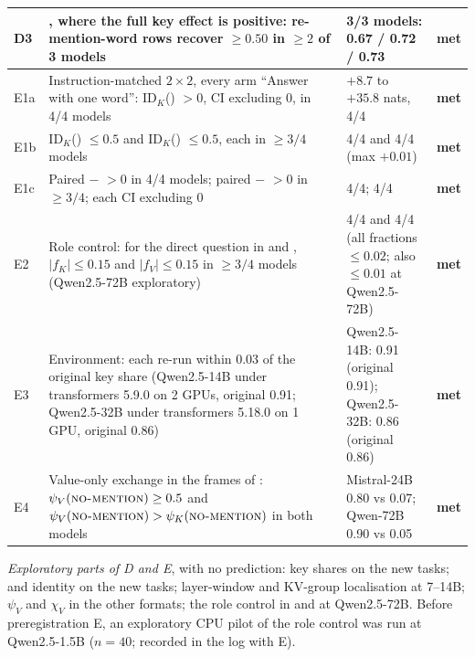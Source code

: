\begin{table}[!ht]
\begin{tabular}{p{}p{}p{}p{}}
D3 & \fmtPost{}, where the full key effect is positive: re-mention-word rows recover $\geq 0.50$ in $\geq 2$ of 3 models & 3/3 models: 0.67 / 0.72 / 0.73 & \textbf{met} \\
\midrule
E1a & Instruction-matched $2{\times}2$, every arm ``Answer with one word'': ID$_K$(\fmtListA{}) $> 0$, CI excluding 0, in 4/4 models & $+8.7$ to $+35.8$ nats, 4/4 & \textbf{met} \\
E1b & ID$_K$(\fmtBefore{}) $\leq 0.5$ and ID$_K$(\fmtSentB{}) $\leq 0.5$, each in $\geq 3/4$ models & 4/4 and 4/4 (max $+0.01$) & \textbf{met} \\
E1c & Paired \fmtListA{} $-$ \fmtBefore{} $> 0$ in 4/4 models; paired \fmtPost{} $-$ \fmtSentB{} $> 0$ in $\geq 3/4$; each CI excluding 0 & 4/4; 4/4 & \textbf{met} \\
E2 & Role control: for the direct question in \fmtOpt{} and \fmtNone{}, $\lvert f_K \rvert \leq 0.15$ and $\lvert f_V \rvert \leq 0.15$ in $\geq 3/4$ models (Qwen2.5-72B exploratory) & 4/4 and 4/4 (all fractions $\leq 0.02$; also $\leq 0.01$ at Qwen2.5-72B) & \textbf{met} \\
E3 & Environment: each re-run within 0.03 of the original \fmtOpt{} key share (Qwen2.5-14B under transformers 5.9.0 on 2 GPUs, original 0.91; Qwen2.5-32B under transformers 5.18.0 on 1 GPU, original 0.86) & Qwen2.5-14B: 0.91 (original 0.91); Qwen2.5-32B: 0.86 (original 0.86) & \textbf{met} \\
E4 & Value-only exchange in the frames of \citet{anonymous2026fitted}: $\psi_V(\text{\textsc{no-mention}{}}) \geq 0.5$ and $\psi_V(\text{\textsc{no-mention}{}}) > \psi_K(\text{\textsc{no-mention}{}})$ in both models & Mistral-24B 0.80 vs 0.07; Qwen-72B 0.90 vs 0.05 & \textbf{met} \\
\bottomrule
\end{tabular}

\smallskip
\begin{minipage}{0.94\textwidth}
\footnotesize
\emph{Exploratory parts of D and E}, with no prediction: key shares on the new tasks; \fmtLetter{} and \fmtPost{} identity on the new tasks; layer-window and KV-group localisation at 7--14B; $\psi_V$ and $\chi_V$ in the other formats; the role control in \fmtLetter{} and at Qwen2.5-72B. Before preregistration E, an exploratory CPU pilot of the role control was run at Qwen2.5-1.5B ($n = 40$; recorded in the log with E).
\end{minipage}
\end{table}


